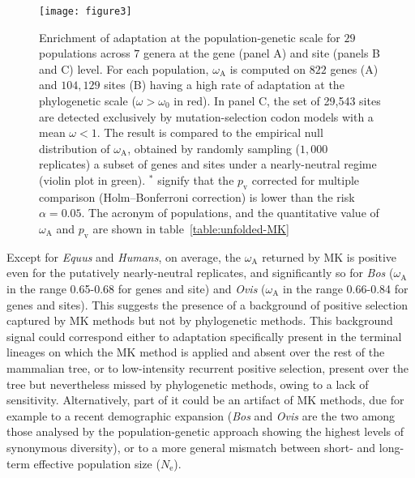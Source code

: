 \documentclass[9pt,twocolumn,twoside,lineno]{pnas-new}
\newcommand{\Ne}{N_{\mathrm{e}}}
\newcommand{\rateApop}{\omega_{\mathrm{A}}}
\begin{document}
\begin{figure*}[htb]
       \centering
       \texttt{[image: figure3]}
       \caption{
              Enrichment of adaptation at the population-genetic scale for $29$ populations across $7$ genera at the gene (panel A) and site (panels B and C) level.
              For each population, $\rateApop$ is computed on $822$ genes (A) and $104,129$ sites (B) having a high rate of adaptation at the phylogenetic scale ($\omega > \omega_0$ in red).
              In panel C, the set of 29,543 sites are detected exclusively by mutation-selection codon models with a mean $\omega < 1 $.
              The result is compared to the empirical null distribution of $\rateApop$, obtained by randomly sampling ($1,000$ replicates) a subset of genes and sites under a nearly-neutral regime (violin plot in green).
              $^*$ signify that the $p_{\mathrm{v}}$ corrected for multiple comparison (Holm–Bonferroni correction) is lower than the risk $\alpha=0.05$.
              The acronym of populations, and the quantitative value of $\rateApop$ and $p_{\mathrm{v}}$ are shown in table~\ref{table:unfolded-MK}}
       \label{fig:unfolded-MK}
\end{figure*}

Except for \textit{Equus} and \textit{Humans}, on average, the $\rateApop$ returned by MK is positive even for the putatively nearly-neutral replicates, and significantly so for \textit{Bos} ($\rateApop$ in the range 0.65-0.68 for genes and site) and \textit{Ovis} ($\rateApop$ in the range 0.66-0.84 for genes and sites).
This suggests the presence of a background of positive selection captured by MK methods but not by phylogenetic methods.
This background signal could correspond either to adaptation specifically present in the terminal lineages on which the MK method is applied and absent over the rest of the mammalian tree, or to low-intensity recurrent positive selection, present over the tree but nevertheless missed by phylogenetic methods, owing to a lack of sensitivity.
Alternatively, part of it could be an artifact of MK methods, due for example to a recent demographic expansion (\textit{Bos} and \textit{Ovis} are the two among those analysed by the population-genetic approach showing the highest levels of synonymous diversity), or to a more general mismatch between short- and long-term effective population size ($\Ne$)\cite{rousselle_overestimation_2018}.
\end{document}
